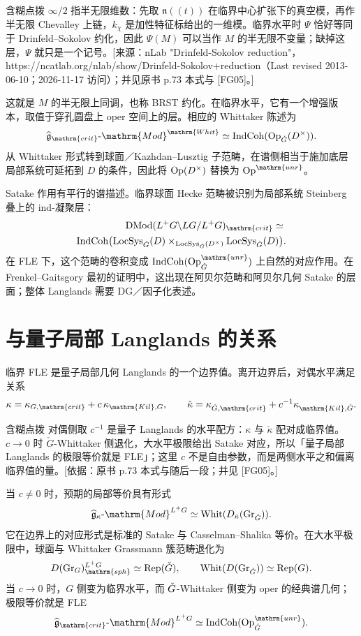 \begin{transnote}{含糊点拨}
$\infty/2$ 指半无限维数：先取 $\mathfrak n((t))$ 在临界中心扩张下的真空模，再作半无限 Chevalley 上链，$k_\chi$ 是加性特征标给出的一维模。临界水平时 $\Psi$ 恰好等同于 Drinfeld–Sokolov 约化，因此 $\Psi(M)$ 可以当作 $M$ 的半无限不变量；缺掉这层，$\Psi$ 就只是一个记号。[来源：nLab "Drinfeld-Sokolov reduction"，https://ncatlab.org/nlab/show/Drinfeld-Sokolov+reduction（Last revised 2013-06-10；2026-11-17 访问）；并见原书 p.73 本式与 [FG05]。]
\end{transnote}
这就是 $M$ 的半无限上同调，也称 BRST 约化。在临界水平，它有一个增强版本，取值于穿孔圆盘上 oper 空间上的层。相应的 Whittaker 陈述为
\[\widehat{\mathfrak g}_{\mathrm{crit}}\text{-}\mathrm{Mod}^{\mathrm{Whit}}\simeq\IndCoh(\Op_{\checkG}(D^\times)).\]
从 Whittaker 形式转到球面／Kazhdan–Lusztig 子范畴，在谱侧相当于施加底层局部系统可延拓到 $D$ 的条件，因此将 $\operatorname{Op}(D^\times)$ 替换为 $\Op^{\mathrm{unr}}$。

Satake 作用有平行的谱描述。临界球面 Hecke 范畴被识别为局部系统 Steinberg 叠上的 ind-凝聚层：
\[\begin{split}
\DMod(L^+G\backslash LG/L^+G)_{\mathrm{crit}}\simeq{}\\
\IndCoh\bigl(\LocSys_{\checkG}(D)\times_{\LocSys_{\checkG}(D^\times)}\LocSys_{\checkG}(D)\bigr).
\end{split}\]
\enlargethispage{\baselineskip}
在 FLE 下，这个范畴的卷积变成 $\IndCoh(\Op^{\mathrm{unr}}_{\checkG})$ 上自然的对应作用。在 Frenkel–Gaitsgory 最初的证明中，这出现在阿贝尔范畴和阿贝尔几何 Satake 的层面；整体 Langlands 需要 DG／因子化表述。

\section{与量子局部 Langlands 的关系}\label{sec:15.4}
临界 FLE 是量子局部几何 Langlands 的一个边界值\cite{FG05}。离开边界后，对偶水平满足关系
\[\kappa=\kappa_{G,\mathrm{crit}}+c\,\kappa_{\mathrm{Kil},G},\qquad
\check\kappa=\kappa_{\checkG,\mathrm{crit}}+c^{-1}\kappa_{\mathrm{Kil},\checkG}.\]

\begin{transnote}{含糊点拨}
对偶侧取 $c^{-1}$ 是量子 Langlands 的水平配方：$\kappa$ 与 $\check\kappa$ 配对成临界值。$c\to0$ 时 $\check G$-Whittaker 侧退化，大水平极限给出 Satake 对应，所以「量子局部 Langlands 的极限等价就是 FLE」；这里 $c$ 不是自由参数，而是两侧水平之和偏离临界值的量。[依据：原书 p.73 本式与随后一段；并见 [FG05]。]
\end{transnote}
当 $c\ne0$ 时，预期的局部等价具有形式
\[\widehat{\mathfrak g}_{\kappa}\text{-}\mathrm{Mod}^{L^+G}\simeq\Whit(D_{\check\kappa}(\Gr_{\checkG})).\]
它在边界上的对应形式是标准的 Satake 与 Casselman–Shalika 等价。在大水平极限中，球面与 Whittaker Grassmann 簇范畴退化为
\[D(\Gr_G)^{L^+G}_{\mathrm{sph}}\simeq\Rep(\checkG),\qquad\Whit(D(\Gr_{\checkG}))\simeq\Rep(G).\]
当 $c\to0$ 时，$G$ 侧变为临界水平，而 $\check{G}$-Whittaker 侧变为 oper 的经典谱几何；极限等价就是 FLE
\[\widehat{\mathfrak g}_{\mathrm{crit}}\text{-}\mathrm{Mod}^{L^+G}\simeq\IndCoh(\Op^{\mathrm{unr}}_{\checkG}).\]

